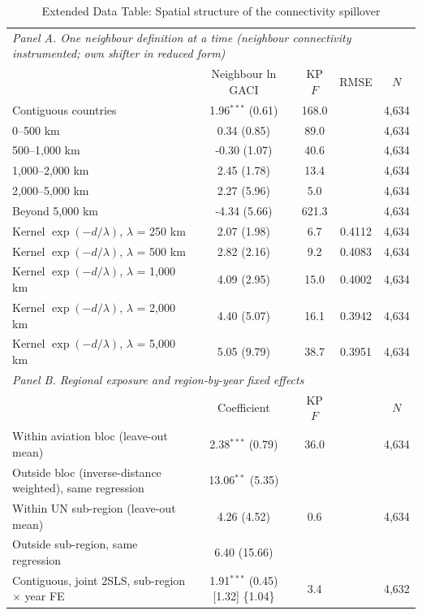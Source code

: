 \begin{table}[htbp]
\centering
\begin{threeparttable}
\caption{Extended Data Table: Spatial structure of the connectivity spillover}
\label{tab:spill_ext}
\scriptsize
\begin{tabular}{lcccc}
\toprule
\multicolumn{5}{l}{\textit{Panel A. One neighbour definition at a time (neighbour connectivity instrumented; own shifter in reduced form)}} \\
 & Neighbour ln GACI & KP $F$ & RMSE & $N$ \\
\midrule
  Contiguous countries & 1.96$^{***}$ (0.61) & 168.0 & & 4,634 \\
  0--500 km & 0.34 (0.85) & 89.0 & & 4,634 \\
  500--1,000 km & -0.30 (1.07) & 40.6 & & 4,634 \\
  1,000--2,000 km & 2.45 (1.78) & 13.4 & & 4,634 \\
  2,000--5,000 km & 2.27 (5.96) & 5.0 & & 4,634 \\
  Beyond 5,000 km & -4.34 (5.66) & 621.3 & & 4,634 \\
  Kernel $\exp(-d/\lambda)$, $\lambda$ = 250 km & 2.07 (1.98) & 6.7 & 0.4112 & 4,634 \\
  Kernel $\exp(-d/\lambda)$, $\lambda$ = 500 km & 2.82 (2.16) & 9.2 & 0.4083 & 4,634 \\
  Kernel $\exp(-d/\lambda)$, $\lambda$ = 1,000 km & 4.09 (2.95) & 15.0 & 0.4002 & 4,634 \\
  Kernel $\exp(-d/\lambda)$, $\lambda$ = 2,000 km & 4.40 (5.07) & 16.1 & 0.3942 & 4,634 \\
  Kernel $\exp(-d/\lambda)$, $\lambda$ = 5,000 km & 5.05 (9.79) & 38.7 & 0.3951 & 4,634 \\
\midrule
\multicolumn{5}{l}{\textit{Panel B. Regional exposure and region-by-year fixed effects}} \\
 & Coefficient & KP $F$ & & $N$ \\
  Within aviation bloc (leave-out mean) & 2.38$^{***}$ (0.79) & 36.0 & & 4,634 \\
  Outside bloc (inverse-distance weighted), same regression & 13.06$^{**}$ (5.35) & & & \\
  Within UN sub-region (leave-out mean) & 4.26 (4.52) & 0.6 & & 4,634 \\
  Outside sub-region, same regression & 6.40 (15.66) & & & \\
  Contiguous, joint 2SLS, sub-region $\times$ year FE & 1.91$^{***}$ (0.45) [1.32] \{1.04\} & 3.4 & & 4,632 \\

\end{tabular}
\end{threeparttable}
\end{table}
